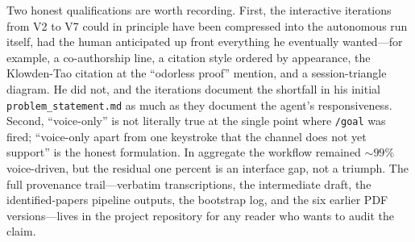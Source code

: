 \documentclass[11pt]{article}
\begin{document}
Two honest qualifications are worth recording. First, the interactive iterations from V2 to V7 could in principle have been compressed into the autonomous run itself, had the human anticipated up front everything he eventually wanted---for example, a co-authorship line, a citation style ordered by appearance, the Klowden-Tao citation at the ``odorless proof'' mention, and a session-triangle diagram. He did not, and the iterations document the shortfall in his initial \texttt{problem\_statement.md} as much as they document the agent's responsiveness. Second, ``voice-only'' is not literally true at the single point where \texttt{/goal} was fired; ``voice-only apart from one keystroke that the channel does not yet support'' is the honest formulation. In aggregate the workflow remained ${\sim}99\%$ voice-driven, but the residual one percent is an interface gap, not a triumph. The full provenance trail---verbatim transcriptions, the intermediate draft, the identified-papers pipeline outputs, the bootstrap log, and the six earlier PDF versions---lives in the project repository for any reader who wants to audit the claim.



\end{document}
